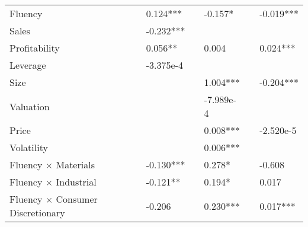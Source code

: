 \documentclass[a4paper,11pt]{report}
\begin{document}
\begin{table}[h!]
\begin{tabular}{llclllc}
\multicolumn{1}{l|}{Fluency}              &  & \multicolumn{1}{l}{0.124***} &  & -0.157*                                     &  & \multicolumn{1}{l}{-0.019***} \\
[1ex]
\multicolumn{1}{l|}{Sales}                &  & \multicolumn{1}{l}{-0.232***}   &  &                                           &  &                              \\
[1ex]
\multicolumn{1}{l|}{Profitability}        &  & \multicolumn{1}{l}{0.056**} &  & 0.004                                    &  &  \multicolumn{1}{l}{0.024***}                            \\
[1ex]
\multicolumn{1}{l|}{Leverage}             &  & \multicolumn{1}{l}{-3.375e-4} &  &                                             &  &                              \\
[1ex]
\multicolumn{1}{l|}{Size}                 &  &                              &  & 1.004***                                      &  &   \multicolumn{1}{l}{-0.204***}                           \\
[1ex]
\multicolumn{1}{l|}{Valuation}            &  &                              &  & -7.989e-4                                     &  &                              \\
[1ex]
\multicolumn{1}{l|}{Price}                &  &                              &  & 0.008***                                    &  &              \multicolumn{1}{l}{-2.520e-5}                \\
[1ex]
\multicolumn{1}{l|}{Volatility}           &  &                              &  & 0.006***                                    &  &                              \\
[1ex]
\multicolumn{1}{l|}{Fluency $\times$ Materials}           &  &    \multicolumn{1}{l}{-0.130***}                          &  & 0.278*                                    &  &  \multicolumn{1}{l}{-0.608}                            \\
[1ex]
\multicolumn{1}{l|}{Fluency $\times$ Industrial }           &  &     \multicolumn{1}{l}{-0.121**}                          &  &     0.194*                                &  &   \multicolumn{1}{l}{0.017}                           \\
[1ex]
\multicolumn{1}{l|}{Fluency $\times$ Consumer Discretionary}           &  &   \multicolumn{1}{l}{-0.206}                            &  &    0.230***                                 &  &  \multicolumn{1}{l}{0.017***}                             \\
[1ex]

\end{tabular}
\end{table}
\end{document}
